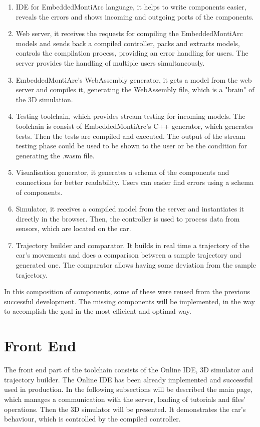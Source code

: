 \begin{enumerate}
    \item IDE for EmbeddedMontiArc language, it helps to write components easier, reveals the errors and shows incoming and outgoing ports of the components.
    \item Web server, it receives the requests for compiling the EmbeddedMontiArc models and sends back a compiled controller, packs and extracts models, controls the compilation process, providing an error handling for users. The server provides the handling of multiple users simultaneously.
    \item EmbeddedMontiArc's WebAssembly generator, it gets a model from the web server and compiles it, generating the WebAssembly file, which is a "brain" of the 3D simulation.
    \item Testing toolchain, which provides stream testing for incoming models. The toolchain is consist of EmbeddedMontiArc's C++ generator, which generates tests. Then the tests are compiled and executed. The output of the stream testing phase could be used to be shown to the user or be the condition for generating the .wasm file.
    \item Visualisation generator, it generates a schema of the components and connections for better readability. Users can easier find errors using a schema of components.
    \item Simulator, it receives a compiled model from the server and instantiates it directly in the browser. Then, the controller is used to process data from sensors, which are located on the car.
    \item Trajectory builder and comparator. It builds in real time a trajectory of the car's movements and does a comparison between a sample trajectory and generated one. The comparator allows having some deviation from the sample trajectory.
\end{enumerate}
In this composition of components, some of these were reused from the previous successful development. The missing components will be implemented, in the way to accomplish the goal in the most efficient and optimal way.

\section{Front End}
The front end part of the toolchain consists of the Online IDE, 3D simulator and trajectory builder. The Online IDE has been already implemented and successful used in production. In the following subsections will be described the main page, which manages a communication with the server, loading of tutorials and files' operations. Then the 3D simulator will be presented. It demonstrates the car's behaviour, which is controlled by the compiled controller. 

